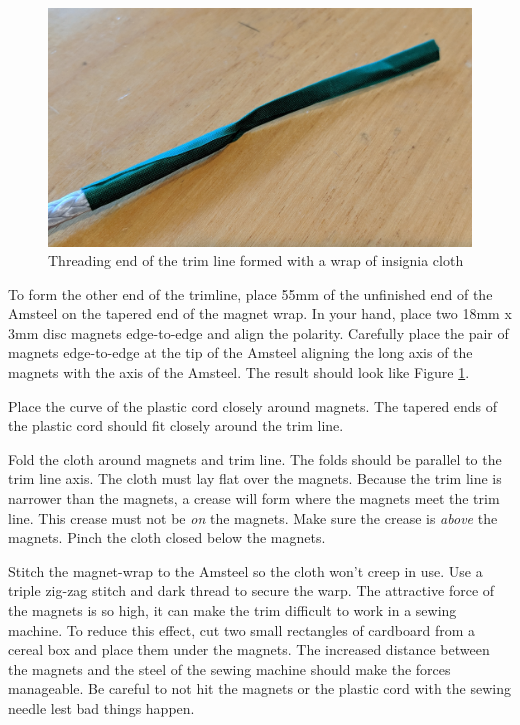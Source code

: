 \documentclass[]{book}
\begin{document}
\begin{figure}

{\centering \includegraphics[width=0.7\linewidth]{images/thread_end_of_trimline} 

}

\caption{Threading end of the trim line formed with a wrap of insignia cloth}\label{fig:thread-end}
\end{figure}

To form the other end of the trimline, place 55mm of the unfinished end of the Amsteel on the tapered end of the magnet wrap. In your hand, place two 18mm x 3mm disc magnets edge-to-edge and align the polarity. Carefully place the pair of magnets edge-to-edge at the tip of the Amsteel aligning the long axis of the magnets with the axis of the Amsteel. The result should look like Figure \ref{fig:thread-end}.

Place the curve of the plastic cord closely around magnets. The tapered ends of the plastic cord should fit closely around the trim line.

Fold the cloth around magnets and trim line. The folds should be parallel to the trim line axis. The cloth must lay flat over the magnets. Because the trim line is narrower than the magnets, a crease will form where the magnets meet the trim line. This crease must not be \emph{on} the magnets. Make sure the crease is \emph{above} the magnets. Pinch the cloth closed below the magnets.

Stitch the magnet-wrap to the Amsteel so the cloth won't creep in use. Use a triple zig-zag stitch and dark thread to secure the warp. The attractive force of the magnets is so high, it can make the trim difficult to work in a sewing machine. To reduce this effect, cut two small rectangles of cardboard from a cereal box and place them under the magnets. The increased distance between the magnets and the steel of the sewing machine should make the forces manageable. Be careful to not hit the magnets or the plastic cord with the sewing needle lest bad things happen.
\end{document}
